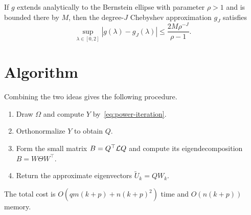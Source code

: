\begin{lemma}
\label{lem:chebyshev}
If $g$ extends analytically to the Bernstein ellipse with parameter $\rho > 1$ and is bounded there by $M$, then the degree-$J$ Chebyshev approximation $g_J$ satisfies
\[
  \sup_{\lambda \in [0, 2]} |g(\lambda) - g_J(\lambda)| \le \frac{2M \rho^{-J}}{\rho - 1} .
\]
\end{lemma}

\section{Algorithm}

Combining the two ideas gives the following procedure.
\begin{enumerate}
  \item Draw $\Omega$ and compute $Y$ by~\eqref{eq:power-iteration}.
  \item Orthonormalize $Y$ to obtain $Q$.
  \item Form the small matrix $B = Q^\top \mathcal{L} Q$ and compute its eigendecomposition $B = W \Theta W^\top$.
  \item Return the approximate eigenvectors $\tilde{U}_k = Q W_k$.
\end{enumerate}
The total cost is $O\left(q m (k + p) + n (k + p)^2\right)$ time and $O\left(n (k + p)\right)$ memory.
